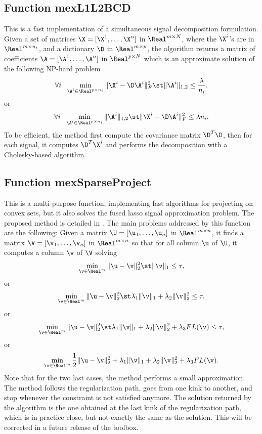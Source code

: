 \documentclass[a4paper, 11pt]{article}
\begin{document}
\subsection{Function mexL1L2BCD}
This is a fast implementation of a simultaneous signal decomposition formulation. Given a set of matrices $\X=[\X^1,\ldots,\X^n]$  in $\Real^{m \times N}$, where the $\X^i$'s are in $\Real^{m \times n_i}$, and a dictionary $\D$ in $\Real^{m \times p}$, the algorithm returns a matrix of coefficients $\A=[\A^1,\ldots,\A^n]$ in $\Real^{p \times N}$ which is an approximate solution of the following NP-hard problem
\begin{equation}
   \forall i~~ \min_{\A^i \in \Real^{p \times n_i}} \|\X^i-\D\A^i\|_F^2 \st \|\A^i\|_{1,2} \leq \frac{\lambda}{n_i}.
\end{equation}
or 
\begin{equation}
   \forall i~~ \min_{\A^i \in \Real^{p \times n_i}}  \|\A^i\|_{1,2} \st \|\X^i-\D\A^i\|_F^2 \leq \lambda n_i.
\end{equation}
To be efficient, the method first compute the covariance matrix $\D^T\D$, then for each signal, it computes $\D^T\X^i$ and performs the decomposition with a Cholesky-based algorithm.

{\footnotesize

}


\subsection{Function mexSparseProject}
This is a multi-purpose function, implementing fast algorithms for projecting
on convex sets, but it also solves the fused lasso signal approximation
problem. The proposed method is detailed in \cite{mairal9}.  The main problems
addressed by this function are the following: Given a matrix
$\U=[\u_1,\ldots,\u_n]$ in $\Real^{m \times n}$, it finds a matrix
$\V=[\v_1,\ldots,\v_n]$ in $\Real^{m \times n}$ so that for all column $\u$ of $\U$,
it computes a column $\v$ of $\V$ solving
\begin{equation}
   \min_{\v \in \Real^m} \|\u-\v\|_2^2  \st \|\v\|_1 \leq \tau,
\end{equation}
or
\begin{equation}
   \min_{\v \in \Real^m} \|\u-\v\|_2^2  \st \lambda_1\|\v\|_1 +\lambda_2\|\v\|_2^2\leq \tau,
\end{equation}
or
\begin{equation}
   \min_{\v \in \Real^m} \|\u-\v\|_2^2  \st \lambda_1\|\v\|_1 +\lambda_2\|\v\|_2^2+ \lambda_3 FL(\v) \leq \tau,
\end{equation}
or
\begin{equation}
   \min_{\v \in \Real^m} \frac{1}{2}\|\u-\v\|_2^2 + \lambda_1\|\v\|_1 +\lambda_2\|\v\|_2^2+ \lambda_3 FL(\v).
\end{equation}
Note that for the two last cases, the method performs a small approximation.
The method follows the regularization path, goes from one kink to another, and 
stop whenever the constraint is not satisfied anymore. The solution returned 
by the algorithm is the one obtained at the last kink of the regularization path,
which is in practice close, but not exactly the same as the solution.
This will be corrected in a future release of the toolbox.
\end{document}
